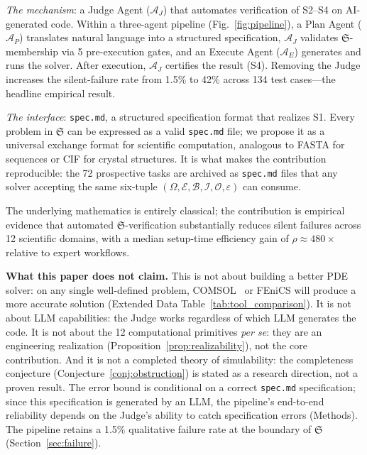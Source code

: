 \documentclass[11pt,a4paper]{article}
\newcommand{\Sclass}{\mathfrak{S}}
\newcommand{\Agent}{\mathcal{A}}
\newcommand{\Domain}{\Omega}
\begin{document}
\emph{The mechanism}: a Judge Agent ($\Agent_J$) that automates verification of S2--S4 on AI-generated code. Within a three-agent pipeline (Fig.~\ref{fig:pipeline}), a Plan Agent ($\Agent_P$) translates natural language into a structured specification, $\Agent_J$ validates $\Sclass$-membership via 5 pre-execution gates, and an Execute Agent ($\Agent_E$) generates and runs the solver. After execution, $\Agent_J$ certifies the result (S4). Removing the Judge increases the silent-failure rate from 1.5\% to 42\% across 134 test cases---the headline empirical result.

\emph{The interface}: \texttt{spec.md}, a structured specification format that realizes S1. Every problem in $\Sclass$ can be expressed as a valid \texttt{spec.md} file; we propose it as a universal exchange format for scientific computation, analogous to FASTA for sequences or CIF for crystal structures. It is what makes the contribution reproducible: the 72 prospective tasks are archived as \texttt{spec.md} files that any solver accepting the same six-tuple $(\Domain, \mathcal{E}, \mathcal{B}, \mathcal{I}, \mathcal{O}, \varepsilon)$ can consume.

The underlying mathematics is entirely classical; the contribution is empirical evidence that automated $\Sclass$-verification substantially reduces silent failures across 12 scientific domains, with a median setup-time efficiency gain of $\rho \approx 480\times$ relative to expert workflows.

\textbf{What this paper does not claim.} This is not about building a better PDE solver: on any single well-defined problem, COMSOL~\cite{comsol} or FEniCS will produce a more accurate solution (Extended Data Table~\ref{tab:tool_comparison}). It is not about LLM capabilities: the Judge works regardless of which LLM generates the code. It is not about the 12 computational primitives \emph{per se}: they are an engineering realization (Proposition~\ref{prop:realizability}), not the core contribution. And it is not a completed theory of simulability: the completeness conjecture (Conjecture~\ref{conj:obstruction}) is stated as a research direction, not a proven result. The error bound is conditional on a correct \texttt{spec.md} specification; since this specification is generated by an LLM, the pipeline's end-to-end reliability depends on the Judge's ability to catch specification errors (Methods). The pipeline retains a 1.5\% qualitative failure rate at the boundary of $\Sclass$ (Section~\ref{sec:failure}).
\end{document}
